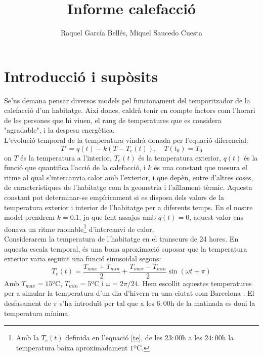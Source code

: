 \documentclass[11pt]{article}
\title{\sffamily {\bfseries EDIM I:} Informe calefacció}
\author{\sffamily Raquel García Bellés, Miquel Saucedo Cuesta}
\date{}
\begin{document}
	
\maketitle
\section*{Introducció i supòsits}
Se'ns demana pensar diversos models pel funcionament del temporitzador de la calefacció d'un habitatge. Així doncs, caldrà tenir en compte factors com l'horari de les persones que hi viuen, el rang de temperatures que es considera "agradable", i la despesa energètica. \\

 

L'evolució temporal de la temperatura vindrà donada per l'equació diferencial:
\begin{equation}\label{principal}
	T'=q(t)-k(T-T_e(t)),\quad T(t_0)=T_0
\end{equation}
on $T$ és la temperatura a l'interior, $T_e(t)$ és la temperatura exterior, $q(t)$ és la funció que quantifica l'acció de la calefacció, i $k$ és una constant que mesura el ritme al qual s'intercanvia calor amb l'exterior, i que depèn, entre d'altres coses, de característiques de l'habitatge com la geometria i l'aïllament tèrmic. Aquesta constant pot determinar-se empíricament si es disposa dels valors de la temperatura exterior i interior de l'habitatge per a diferents temps. En el nostre model prendrem $k=0.1$, ja que fent assajos amb $q(t)=0$, aquest valor ens donava un ritme raonable\footnote{Amb la $T_e(t)$ definida en l'equació \eqref{te}, de les $23:00$h a les $24:00$h la temperatura baixa aproximadament $1$ºC.} d'intercanvi de calor.\\

Considerarem la temperatura de l'habitatge en el transcurs de 24 hores. En aquesta escala temporal, és una bona aproximació suposar que la temperatura exterior varia seguint una funció sinusoidal segons:
 \begin{equation}\label{te}
T_e(t)=\frac{T_{max}+T_{min}}{2}+\frac{T_{max}-T_{min}}{2}\sin\left(\omega t+\pi\right)
\end{equation}
Amb $T_{max}=15$ºC, $T_{min}=5$ºC i $\omega=2\pi/24$. Hem escollit aquestes temperatures per a simular la temperatura d'un dia d'hivern en una ciutat com Barcelona \cite{df}. El desfasament de $\pi$ s'ha introduït per tal que a les $6:00$h de la matinada es doni la temperatura mínima.\\
\end{document}
